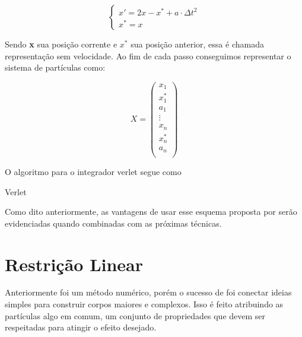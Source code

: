 $$
\begin{cases}
	x' = 2x - x^* + a \cdot \Delta t^2 \\
	x^* = x
\end{cases}
$$

Sendo \textbf{x} sua posição corrente e \textbf{$x^*$} sua posição anterior, essa é chamada representação sem velocidade. Ao fim de cada passo conseguimos representar o sistema de partículas como:

$$
X = \begin{pmatrix}
	x_1 \\
	x^*_1 \\
	a_1 \\
	\vdots \\
	x_n \\
	x^*_n \\
	a_n \\
\end{pmatrix}
$$

O algoritmo para o integrador verlet segue como

\begin{algorithm}[H]
	\caption{Verlet}
\end{algorithm}

Como dito anteriormente, as vantagens de usar esse esquema proposta por \citeauthor{jakobsen2001advanced} serão evidenciadas quando combinadas com as próximas técnicas.

\section{Restrição Linear}

Anteriormente foi um método numérico, porém o sucesso de  foi conectar ideias simples para construir corpos maiores e complexos. Isso é feito atribuindo as partículas algo em comum, um conjunto de propriedades que devem ser respeitadas para atingir o efeito desejado.

